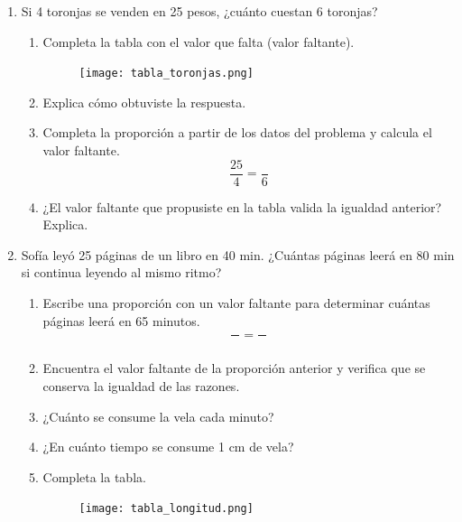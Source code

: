\documentclass[11pt]{book}
\begin{document}
\begin{enumerate}
  \item Si 4 toronjas se venden en 25 pesos, ¿cuánto cuestan 6 toronjas?
        \begin{enumerate}
          \item Completa la tabla con el valor que falta (valor faltante).
                \begin{figure}[H]
                  \centering
                  \texttt{[image: tabla\_toronjas.png]}
                  \label{tab:tabla_toronjas}
                \end{figure}
          \item Explica cómo obtuviste la respuesta.
          \item Completa la proporción a partir de los datos del problema y calcula el valor faltante.
                \[\dfrac{25}{4} = \dfrac{}{6}\]
          \item ¿El valor faltante que propusiste en la tabla valida la igualdad anterior? Explica.
        \end{enumerate}
  \item Sofía leyó 25 páginas de un libro en 40 min. ¿Cuántas páginas leerá en 80 min si continua leyendo al mismo ritmo?
        \begin{enumerate}
          \item Escribe una proporción con un valor faltante para determinar cuántas páginas leerá en 65 minutos.
                \[\dfrac{\text{ }}{\text{ }} = \dfrac{\text{ }}{\text{ }}\]
          \item Encuentra el valor faltante de la proporción anterior y verifica que se conserva la
                igualdad de las razones.
          \item ¿Cuánto se consume la vela cada minuto?
          \item ¿En cuánto tiempo se consume 1 cm de vela?
          \item Completa la tabla.
                \begin{figure}[H]
                  \centering
                  \texttt{[image: tabla\_longitud.png]}
                  \label{tab:tabla_longitud}
                \end{figure}
        \end{enumerate}


\end{enumerate}
\end{document}

